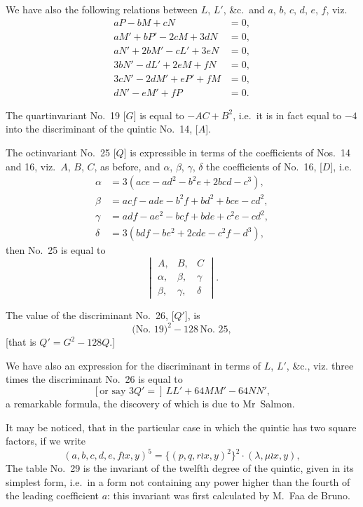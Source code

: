 \documentclass[11pt,a4paper]{book}
\begin{document}
\begin{center}
\clearpage
We have also the following relations between $L$, $L'$, \&c.\ and $a$, $b$, $c$, $d$, $e$, $f$,
viz.
\begin{align*}
aP - bM + cN &= 0,\\
aM' + bP' - 2cM + 3dN &= 0,\\
aN' + 2bM' - cL' + 3eN &= 0,\\
3bN' - dL' + 2eM + fN &= 0,\\
3cN' - 2dM' + eP' + fM &= 0,\\
dN' - eM' + fP &= 0.
\end{align*}

The quartinvariant No.~19 [$G$] is equal to $-AC + B^2$,
i.e.\ it is in fact equal to $-4$ into the discriminant of the quintic No.~14, [$A$].

The octinvariant No.~25 [$Q$] is expressible in terms of the coefficients of Nos.~14 and 16,
viz.\ $A$, $B$, $C$, as before, and $\alpha$, $\beta$, $\gamma$, $\delta$ the coefficients of No.~16, [$D$],
i.e.
\begin{align*}
\alpha &= 3(ace - ad^2 - b^2e + 2bcd - c^3),\\
\beta &= acf - ade - b^2f + bd^2 + bce - cd^2,\\
\gamma &= adf - ae^2 - bcf + bde + c^2e - cd^2,\\
\delta &= 3(bdf - be^2 + 2cde - c^2f - d^3),
\end{align*}
then No.~25 is equal to
\[
\begin{vmatrix}
A, & B, & C \\
\alpha, & \beta, & \gamma \\
\beta, & \gamma, & \delta
\end{vmatrix}
.\]

The value of the discriminant No.~26, [$Q'$], is
\[\text{(No.~19)}^2 - 128\,\text{No.~25},\]
[that is $Q' = G^2 - 128Q$.]

We have also an expression for the discriminant in terms of $L$, $L'$, \&c., viz.
three times the discriminant No.~26 is equal to
\[[\text{or say }3Q' =]\, LL' + 64MM' - 64NN',\]
a remarkable formula, the discovery of which is due to Mr~Salmon.

It may be noticed, that in the particular case in which the quintic has two square
factors, if we write
\[(a, b, c, d, e, f \wr x, y)^5 = \{(p, q, r \wr x, y)^2\}^2 \cdot (\lambda, \mu \wr x, y),\]
\clearpage
The table No.~29 is the invariant of the twelfth degree of the quintic,
given in its simplest form, i.e.\ in a form not containing any power higher than
the fourth of the leading coefficient $a$: this invariant was first calculated by M.~Faa de Bruno.


\end{center}
\end{document}
